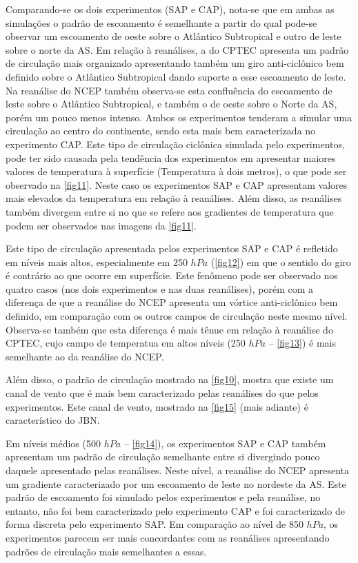 Comparando-se os dois experimentos (SAP e CAP), nota-se que em ambas as \-si\-mu\-la\-ções o padrão de escoamento é semelhante a partir do qual pode-se observar um escoamento de oeste sobre o Atlântico Subtropical e outro de leste sobre o norte da AS. Em relação à reanálises, a do CPTEC apresenta um padrão de circulação mais organizado apresentando também um giro anti-ciclônico bem definido sobre o Atlântico Subtropical dando suporte a esse escoamento de leste. Na reanálise do NCEP também observa-se esta confluência do escoamento de leste sobre o Atlântico Subtropical, e também o de oeste sobre o Norte da AS, porém um pouco menos intenso. Ambos os experimentos tenderam a simular uma circulação ao centro do continente, sendo esta mais bem caracterizada no experimento CAP. Este tipo de circulação ciclônica simulada pelo experimentos, pode ter sido causada pela tendência dos experimentos em apresentar maiores valores de temperatura à superfície (Temperatura à dois metros), o que pode ser observado na \autoref{fig11}. Neste caso os experimentos SAP e CAP apresentam valores mais elevados da temperatura em relação à reanálises. Além disso, as reanálises também divergem entre si no que se refere aos gradientes de temperatura que podem ser observados nas imagens da \autoref{fig11}. 

Este tipo de circulação apresentada pelos experimentos SAP e CAP é refletido em níveis mais altos, especialmente em 250 $hPa$ (\autoref{fig12}) em que o sentido do giro é contrário ao que ocorre em superfície. Este fenômeno pode ser observado nos quatro casos (nos dois experimentos e nas duas reanálises), porém com a diferença de que a reanálise do NCEP apresenta um vórtice anti-ciclônico bem definido, em comparação com os outros campos de circulação neste mesmo nível. Observa-se também que esta diferença é mais tênue em relação à reanálise do CPTEC, cujo campo de temperatua em altos níveis (250 $hPa$ – \autoref{fig13}) é mais semelhante ao da reanálise do NCEP.

Além disso, o padrão de circulação mostrado na \autoref{fig10}, mostra que existe um canal de vento que é mais bem caracterizado pelas reanálises do que pelos experimentos. Este canal de vento, mostrado na \autoref{fig15} (mais adiante) é característico do JBN. 

Em níveis médios (500 $hPa$ – \autoref{fig14}), os experimentos SAP e CAP também apresentam um padrão de circulação semelhante entre si divergindo pouco daquele apresentado pelas reanálises. Neste nível, a reanálise do NCEP apresenta um gradiente caracterizado por um escoamento de leste no nordeste da AS. Este padrão de escoamento foi simulado pelos experimentos e pela reanálise, no entanto, não foi bem caracterizado pelo experimento CAP e foi caracterizado de forma discreta pelo experimento SAP. Em comparação ao nível de 850 $hPa$, os experimentos parecem ser mais concordantes com as reanálises apresentando padrões de circulação mais semelhantes a essas. 

